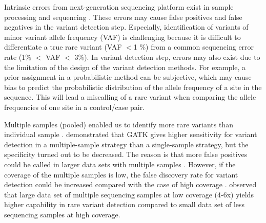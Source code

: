 \documentclass[11pt,reqno]{amsart}
\begin{document}
Intrinsic errors from next-generation sequencing platform exist in sample processing and sequencing \citep{Olson2015}.
These errors may cause false positives and false negatives in the variant detection step.
Especially, identification of variants of minor variant allele frequency (VAF) is challenging because it is difficult to differentiate a true rare variant (VAF $<$1 \%) from a common sequencing error rate (1\% $<$ VAF $<$ 3\%).
In variant detection step, errors may also exist due to the limitation of the design of the variant detection methods.
For example, a prior assignment in a probabilistic method can be subjective, which may cause bias to predict the probabilistic distribution of the allele frequency of a site in the sequence.
This will lead a miscalling of a rare variant when comparing the allele frequencies of one site in a control/case pair.

Multiple samples (pooled) enabled us to identify more rare variants than individual sample \citep{Bao2014, liu2012steps}.
\citep{liu2013variant} demonstrated that GATK gives higher sensitivity for variant detection in a multiple-sample strategy than a single-sample strategy, but the specificity turned out to be decreased.
The reason is that more false positives could be called in larger data sets with multiple samples \citep{Nielsen2011}.
However, if the coverage of the multiple samples is low, the false discovery rate for variant detection could be increased compared with the case of high coverage \citep{Cheng2014}.
\citep{le2011snp} observed that large data set of multiple sequencing samples at low coverage (4-6x) yields higher capability in rare variant detection compared to small data set of less sequencing samples at high coverage.
\end{document}
